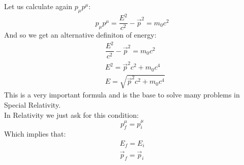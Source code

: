 Let us calculate again $p_{\mu}p^{\mu}$:
\begin{equation}
  p_{\mu}p^{\mu} = \dfrac{E^2}{c^2} - \vec{p}^2 = m_0c^2
\end{equation}
And so we get an alternative definiton of energy:
\begin{equation}
  \begin{split}
    &\dfrac{E^2}{c^2} - \vec{p}^2 = m_0c^2 \\[8pt]
    &E^2 = \vec{p}^2c^2 + m_0c^4 \\[8pt]
    &E = \sqrt{\vec{p}^2c^2 + m_0c^4}
  \end{split}
\end{equation}
This is a very important formula and is the base to solve many problems in Special Relativity.\\
In Relativity we just ask for this condition:
\begin{equation}
  p^{\mu}_f = p^{\mu}_i
\end{equation}
Which implies that:
\begin{equation}
  \begin{split}
    E_f = E_i \\[8pt]
    \vec{p}_f = \vec{p}_i
  \end{split}
\end{equation}
